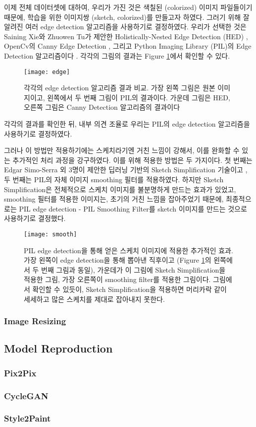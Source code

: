 이제 전체 데이터셋에 대하여, 우리가 가진 것은 색칠된 (colorized) 이미지 파일들이기 때문에, 학습을 위한 이미지쌍 (sketch, colorized)를 만들고자 하였다. 그러기 위해 잘 알려진 여러 edge detection 알고리즘을 사용하기로 결정하였다.
우리가 선택한 것은 Saining Xie와 Zhuowen Tu가 제안한 Holistically-Nested Edge Detection (HED) \cite{Saining2015}, OpenCv의 Canny Edge Detection \cite{opencv}, 그리고 Python Imaging Library (PIL)의 Edge Detection 알고리즘이다 \cite{pillow}. 각각의 그림의 결과는 Figure \ref{fig:edge_detection}에서 확인할 수 있다.
\begin{figure}[t]
	\centering
	\texttt{[image: edge]}
	\caption{각각의 edge detection 알고리즘 결과 비교. 가장 왼쪽 그림은 원본 이미지이고, 왼쪽에서 두 번째 그림이 PIL의 결과이다. 가운데 그림은 HED, 오른쪽 그림은 Canny Detection 알고리즘의 결과이다}
	\label{fig:edge_detection}
\end{figure}
각각의 결과를 확인한 뒤, 내부 의견 조율로 우리는 PIL의 edge detection 알고리즘을 사용하기로 결정하였다. 

그러나 이 방법만 적용하기에는 스케치라기엔 거친 느낌이 강해서, 이를 완화할 수 있는 추가적인 처리 과정을 강구하였다.
이를 위해 적용한 방법은 두 가지이다.
첫 번째는 Edgar Simo-Serra 외 3명이 제안한 딥러닝 기반의 Sketch Simplification 기술이고 \cite{SimoSerraTOG2018}, 두 번째는 PIL의 자체 이미지 smoothing 필터를 적용하였다.
하지만 Sketch Simplification은 전체적으로 스케치 이미지를 불분명하게 만드는 효과가 있었고, smoothing 필터를 적용한 이미지는, 초기의 거친 느낌을 잡아주었기 때문에, 최종적으로는 PIL edge detection - PIL Smoothing Filter를 sketch 이미지를 만드는 것으로 사용하기로 결정했다.
\begin{figure}[t]
	\centering
	\texttt{[image: smooth]}
	\caption{PIL edge detection을 통해 얻은 스케치 이미지에 적용한 추가적인 효과. 가장 왼쪽이 edge detection을 통해 뽑아낸 직후이고 (Figure \ref{fig:edge_detection}의 왼쪽에서 두 번째 그림과 동일), 가운데가 이 그림에 Sketch Simplification을 적용한 그림, 가장 오른쪽이 smoothing filter를 적용한 그림이다. 그림에서 확인할 수 있듯이, Sketch Simplification을 적용하면 머리카락 같이 세세하고 많은 스케치를 제대로 잡아내지 못한다.}
	\label{fig:edge_smooth}
\end{figure}

\subsubsection{Image Resizing}

\subsection{Model Reproduction}

\subsubsection{Pix2Pix}

\subsubsection{CycleGAN}

\subsubsection{Style2Paint}